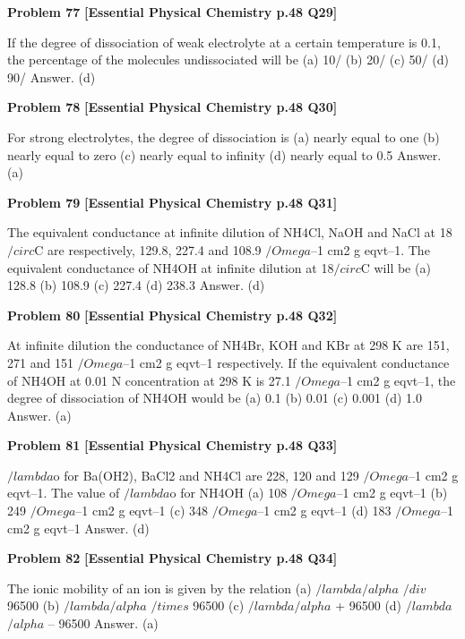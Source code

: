 \begin{problembox}
\textbf{Problem 77} \hfill \textbf{[Essential Physical Chemistry p.48 Q29]}
\label{q:ext-essential_all_questions-77}

If the degree of dissociation of weak electrolyte at a certain temperature is 0.1, the percentage of the
molecules undissociated will be
(a)
10/%
(b)
20/%
(c)
50/%
(d)
90/%
Answer. (d)
\end{problembox}

\begin{problembox}
\textbf{Problem 78} \hfill \textbf{[Essential Physical Chemistry p.48 Q30]}
\label{q:ext-essential_all_questions-78}

For strong electrolytes, the degree of dissociation is
(a)
nearly equal to one
(b)
nearly equal to zero
(c)
nearly equal to infinity
(d)
nearly equal to 0.5
Answer. (a)
\end{problembox}

\begin{problembox}
\textbf{Problem 79} \hfill \textbf{[Essential Physical Chemistry p.48 Q31]}
\label{q:ext-essential_all_questions-79}

The equivalent conductance at infinite dilution of NH4Cl, NaOH and NaCl at 18$/circ$C are respectively,
129.8, 227.4 and 108.9 $/Omega$--1 cm2 g eqvt--1. The equivalent conductance of NH4OH at infinite dilution
at 18$/circ$C will be
(a)
128.8
(b)
108.9
(c)
227.4
(d)
238.3
Answer. (d)
\end{problembox}

\begin{problembox}
\textbf{Problem 80} \hfill \textbf{[Essential Physical Chemistry p.48 Q32]}
\label{q:ext-essential_all_questions-80}

At infinite dilution the conductance of NH4Br, KOH and KBr at 298 K are 151, 271 and 151 $/Omega$--1 cm2
g eqvt--1 respectively. If the equivalent conductance of NH4OH at 0.01 N concentration at 298 K is 27.1
$/Omega$--1 cm2 g eqvt--1, the degree of dissociation of NH4OH would be
(a)
0.1
(b)
0.01
(c)
0.001
(d)
1.0
Answer. (a)
\end{problembox}

\begin{problembox}
\textbf{Problem 81} \hfill \textbf{[Essential Physical Chemistry p.48 Q33]}
\label{q:ext-essential_all_questions-81}

$/lambda$o for Ba(OH2), BaCl2 and NH4Cl are 228, 120 and 129 $/Omega$--1 cm2 g eqvt--1. The value of $/lambda$o for NH4OH
(a)
108 $/Omega$--1 cm2 g eqvt--1
(b)
249 $/Omega$--1 cm2 g eqvt--1
(c)
348 $/Omega$--1 cm2 g eqvt--1
(d)
183 $/Omega$--1 cm2 g eqvt--1
Answer. (d)
\end{problembox}

\begin{problembox}
\textbf{Problem 82} \hfill \textbf{[Essential Physical Chemistry p.48 Q34]}
\label{q:ext-essential_all_questions-82}

The ionic mobility of an ion is given by the relation
(a)
$/lambda$$/alpha$ $/div$ 96500
(b)
$/lambda$$/alpha$ $/times$ 96500
(c)
$/lambda$$/alpha$ + 96500
(d)
$/lambda$$/alpha$ -- 96500
Answer. (a)
\end{problembox}
